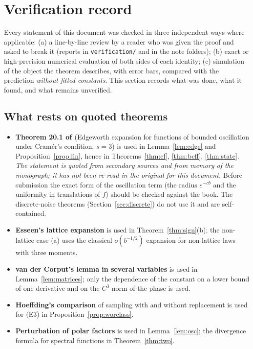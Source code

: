 \section{Verification record}\label{sec:verif}

Every statement of this document was checked in three independent ways where applicable: (a) a line-by-line review by
a reader who was given the proof and asked to break it (reports in \texttt{verification/} and in the note folders);
(b) exact or high-precision numerical evaluation of both sides of each identity; (c) simulation of the object the
theorem describes, with error bars, compared with the prediction \emph{without fitted constants}. This section
records what was done, what it found, and what remains unverified.

\subsection{What rests on quoted theorems}
\begin{itemize}\setlength\itemsep{2pt}
\item \textbf{Theorem 20.1 of \citet{br}} (Edgeworth expansion for functions of bounded oscillation under Cram\'er's
condition, $s=3$) is used in Lemma~\ref{lem:edge} and Proposition~\ref{prop:lin}, hence in
Theorems~\ref{thm:cf}, \ref{thm:beff}, \ref{thm:state}. \emph{The statement is quoted from secondary sources and from
memory of the monograph; it has not been re-read in the original for this document.} Before submission the exact form
of the oscillation term (the radius $e^{-cb}$ and the uniformity in translations of $f$) should be checked against the
book. The discrete-noise theorems (Section~\ref{sec:discrete}) do not use it and are self-contained.
\item \textbf{Esseen's lattice expansion} \citep[\S43]{gk} is used in Theorem~\ref{thm:sign}(b); the non-lattice case (a)
uses the classical $o(b^{-1/2})$ expansion for non-lattice laws with three moments.
\item \textbf{van der Corput's lemma in several variables} \citep[Ch.~VIII, \S2.2, Prop.~5]{stein} is used in
Lemma~\ref{lem:matrices}; only the dependence of the constant on a lower bound of one derivative and on the $C^{3}$ norm
of the phase is used.
\item \textbf{Hoeffding's comparison} of sampling with and without replacement \citep[Thm.~4]{hoeffding} is used for
(E3) in Proposition~\ref{prop:worclass}.
\item \textbf{Perturbation of polar factors} \citep{lisun} is used in Lemma~\ref{lem:osc}; the divergence formula
for spectral functions \citep{candes} in Theorem~\ref{thm:two}.
\end{itemize}

